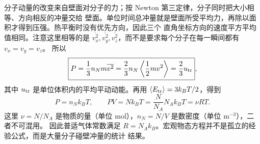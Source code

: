 分子动量的改变来自壁面对分子的力；按 Newton 第三定律，分子同时把大小相等、方向相反的冲量交给
壁面。单位时间总冲量就是壁面所受平均力，再除以面积才得到压强。热平衡时没有优先方向，因此三个
直角坐标方向的速度平方平均值相同。注意这里相等的是 $\overline{v_x^2},\overline{v_y^2},
\overline{v_z^2}$，而不是要求每个分子在每一瞬间都有 $v_x=v_y=v_z$。
所以
\begin{equation}
  \boxed{P=\frac13n_Nm\overline{v^2}
  =\frac23n_N\left\langle\frac12mv^2\right\rangle
  =\frac23u_{\rm tr}},
\end{equation}
其中 $u_{\rm tr}$ 是单位体积内的平均平动动能。再用
$\langle E_{\rm tr}\rangle=3k_BT/2$，得到
\begin{equation}
  \boxed{P=n_Nk_BT},
  \qquad
  \boxed{PV=Nk_BT=\frac{N}{N_A}N_Ak_BT=\nu RT}.
\end{equation}
这里 $\nu=N/N_A$ 是物质的量（单位 $\mathrm{mol}$），$n_N=N/V$ 是数密度（单位 $\mathrm{m^{-3}}$），二者不可混用。
因此普适气体常数满足 $R=N_Ak_B$。宏观物态方程并不是孤立的经验公式，而是大量分子碰壁冲量的统计
结果。



